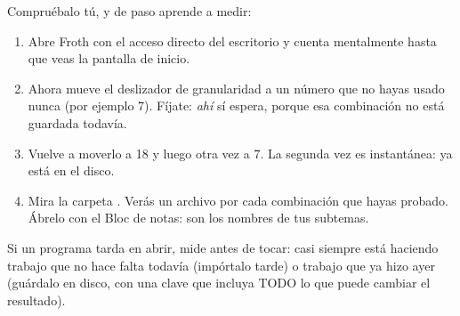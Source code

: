 \documentclass[11pt,a4paper]{article}
\begin{document}
\begin{practica}
Compruébalo tú, y de paso aprende a medir:

\begin{enumerate}
  \item Abre Froth con el acceso directo del escritorio y cuenta mentalmente hasta que
        veas la pantalla de inicio.
  \item Ahora mueve el deslizador de granularidad a un número que no hayas usado nunca
        (por ejemplo 7). Fíjate: \emph{ahí} sí espera, porque esa combinación no está
        guardada todavía.
  \item Vuelve a moverlo a 18 y luego otra vez a 7. La segunda vez es instantánea: ya
        está en el disco.
  \item Mira la carpeta . Verás
        un archivo  por cada combinación que hayas probado.
        Ábrelo con el Bloc de notas: son los nombres de tus subtemas.
\end{enumerate}
\end{practica}

\begin{resumen}
Si un programa tarda en abrir, mide antes de tocar: casi siempre está haciendo trabajo
que no hace falta todavía (impórtalo tarde) o trabajo que ya hizo ayer (guárdalo en
disco, con una clave que incluya TODO lo que puede cambiar el resultado).
\end{resumen}
\end{document}
